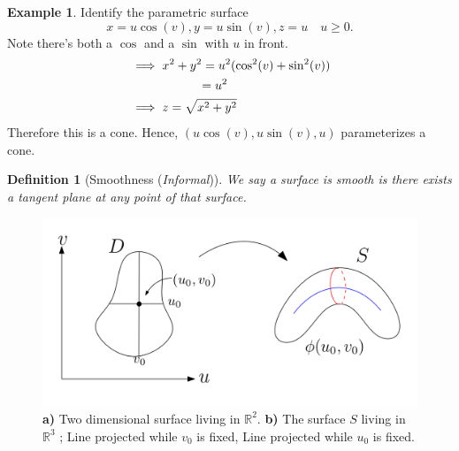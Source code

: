 \documentclass[
	12pt,
	]{article}
\newcommand{\R}{\mathbb{R}}
\theoremstyle{custom}
\theoremstyle{custom}
\theoremstyle{custom}
\theoremstyle{custom}
\newtheorem{definition}{Definition}[section]
\theoremstyle{custom}
\theoremstyle{definition}
\newtheorem{example}{Example}[section]
\theoremstyle{example}
\theoremstyle{note}
\theoremstyle{remark}
\theoremstyle{example}
\newcounter{theo}[section]\setcounter{theo}{0}
\numberwithin{equation}{subsection}
\begin{document}
				\begin{example}
					Identify the parametric surface
					$$ x = u\cos (v) , y= u \sin (v) , z = u \quad u\ge 0.$$
					Note there's both a $\cos$ and a $\sin$ with $u$ in front. 
					\begin{align*}
						&\implies x^{2} + y^{2} = u^{2}(\cos^{2}(v) + \sin^{2}(v)) \\
						&\hphantom{\implies x^{2} + y^{2}}= u^{2} \\
						&\implies z = \sqrt{x^{2} + y^{2}}
					\end{align*}
					Therefore this is a cone. Hence, $(u\cos(v) , u\sin(v), u)$ parameterizes a cone. 
				\end{example}
				
				\begin{definition}[Smoothness (\textit{Informal})]
					We say a surface is smooth is there exists a tangent plane at any point of that surface.
				\end{definition}
				\begin{figure}[H]
				\centering
					\includegraphics[width= 0.8\linewidth]{MATH314_Notes_Fig7.png}
					\captionsetup{margin=1cm, justification=raggedright} \caption{\textbf{a)} Two dimensional surface living in $\R^{2}$. \textbf{b)} The surface $S$ living in $\R^{3}$ ; \color{blue} Line projected while $v_{0}$ is fixed, \color{red} Line projected while $u_{0}$ is fixed. \color{black}}
				\end{figure}
				
\end{document}
